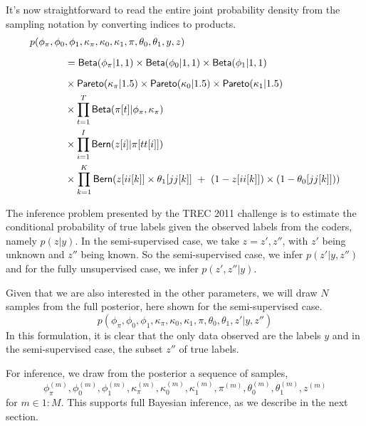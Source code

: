 \documentclass{article}
\begin{document}
It's now straightforward to read the entire joint probability density
from the sampling notation by converting indices to products.
%
\begin{align*}
p(\phi_{\pi},\phi_0&{},\phi_1,\kappa_{\pi},\kappa_0,\kappa_1,\pi,\theta_0,\theta_1,y,z)
\\[6pt] &{} = \mbox{\sf Beta}(\phi_{\pi}|1,1) 
     \times \mbox{\sf Beta}(\phi_0|1,1) 
     \times \mbox{\sf Beta}(\phi_1|1,1) 
\\[6pt] &{} \times \mbox{\sf Pareto}(\kappa_{\pi}|1.5)
      \times \mbox{\sf Pareto}(\kappa_0|1.5)
      \times \mbox{\sf Pareto}(\kappa_1|1.5)
\\ &{} \times \prod_{t = 1}^T \mbox{\sf Beta}(\pi[t] | \phi_{\pi}, \kappa_{\pi})
\\ &{} \times \prod_{i = 1}^I \mbox{\sf Bern}(z[i]|\pi[tt[i]])
\\ &{} \times \prod_{k = 1}^K \mbox{\sf Bern}(z[ii[k]] \times \theta_1[jj[k]] 
\ + \ (1 - z[ii[k]]) \times (1 - \theta_0[jj[k]]))
\end{align*}

The inference problem presented by the TREC 2011 challenge is
to estimate the conditional probability of true labels given the
observed labels from the coders, namely $p(z|y)$.  In the
semi-supervised case, we take $z = z', z''$, with $z'$ being
unknown and $z''$ being known.  So the semi-supervised case,
we infer $p(z'|y,z'')$ and for the fully unsupervised case,
we infer $p(z',z''|y)$.

Given that we are also interested in the other parameters, we will
draw $N$ samples from the full posterior, here shown for
the semi-supervised case.
%
\begin{equation*}
p(\phi_{\pi},\phi_0,\phi_1,\kappa_{\pi},\kappa_0,\kappa_1,\pi,\theta_0,\theta_1,z'|y,z'')
\end{equation*}
%
In this formulation, it is clear that the only data observed 
are the labels $y$ and in the semi-supervised case, the subset
$z''$ of true labels.  

For inference, we draw from the posterior a sequence of samples,
%
\begin{equation*}
\phi_{\pi}^{(m)}, \phi_0^{(m)}, \phi_1^{(m)},
\kappa_{\pi}^{(m)}, \kappa_0^{(m)}, \kappa_1^{(m)}, 
\pi^{(m)}, \theta_0^{(m)}, \theta_1^{(m)},
z^{(m)}
\end{equation*}
%
for $m \in 1{:}M$.  This supports full Bayesian inference, as we
describe in the next section.
\end{document}

